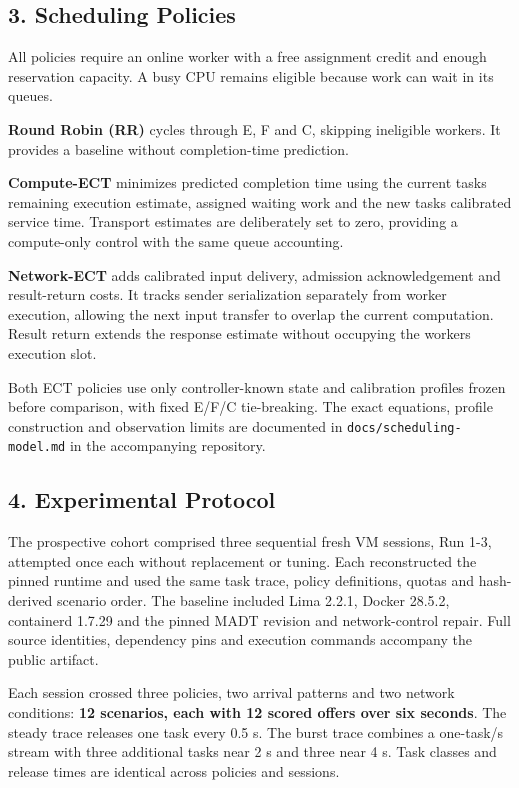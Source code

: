 \documentclass[11pt,a4paper]{article}
\begin{document}
\subsection{3. Scheduling Policies}\label{scheduling-policies}

All policies require an online worker with a free assignment credit and
enough reservation capacity. A busy CPU remains eligible because work
can wait in its queues.

\textbf{Round Robin (RR)} cycles through E, F and C, skipping ineligible
workers. It provides a baseline without completion-time prediction.

\textbf{Compute-ECT} minimizes predicted completion time using the
current task\textquotesingle s remaining execution estimate, assigned
waiting work and the new task\textquotesingle s calibrated service time.
Transport estimates are deliberately set to zero, providing a
compute-only control with the same queue accounting.

\textbf{Network-ECT} adds calibrated input delivery, admission
acknowledgement and result-return costs. It tracks sender serialization
separately from worker execution, allowing the next input transfer to
overlap the current computation. Result return extends the response
estimate without occupying the worker\textquotesingle s execution slot.

Both ECT policies use only controller-known state and calibration
profiles frozen before comparison, with fixed E/F/C tie-breaking. The
exact equations, profile construction and observation limits are
documented in \texttt{docs/scheduling-model.md} in the accompanying
repository.

\Needspace{120pt}

\subsection{4. Experimental Protocol}\label{experimental-protocol}

The prospective cohort comprised three sequential fresh VM sessions, Run
1-3, attempted once each without replacement or tuning. Each
reconstructed the pinned runtime and used the same task trace, policy
definitions, quotas and hash-derived scenario order. The baseline
included Lima 2.2.1, Docker 28.5.2, containerd 1.7.29 and the pinned
MADT revision and network-control repair. Full source identities,
dependency pins and execution commands accompany the public artifact.

Each session crossed three policies, two arrival patterns and two
network conditions: \textbf{12 scenarios, each with 12 scored offers
over six seconds}. The steady trace releases one task every 0.5 s. The
burst trace combines a one-task/s stream with three additional tasks
near 2 s and three near 4 s. Task classes and release times are
identical across policies and sessions.
\end{document}
